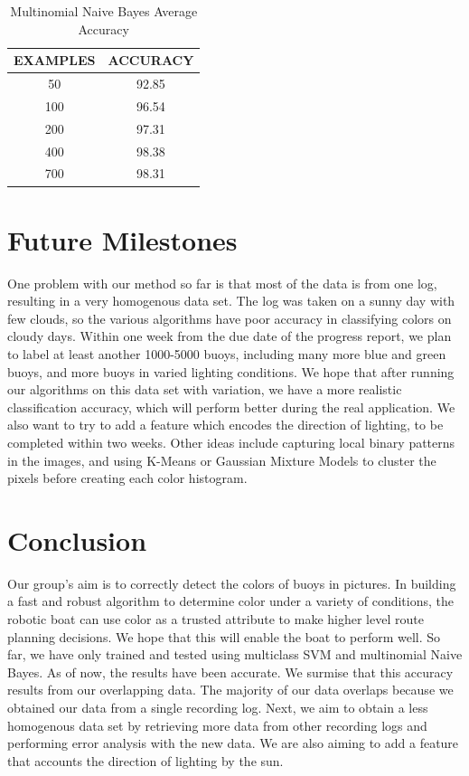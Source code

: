 \documentclass{article} %
\begin{document}
\begin{table}[hp]
\caption{Multinomial Naive Bayes Average Accuracy}
\begin{center}
\begin{tabular}{c|c}
{\bf EXAMPLES}  &{\bf ACCURACY}
\\ \hline 
50              &92.85 \\
100             &96.54 \\
200             &97.31 \\
400             &98.38 \\
700             &98.31 \\
\end{tabular}
\end{center}
\end{table}

\section{Future Milestones}

One problem with our method so far is that most of the data is from one log, resulting in a very homogenous data set. The log was taken on a sunny day with few clouds, so the various algorithms have poor accuracy in classifying colors on cloudy days. Within one week from the due date of the progress report, we plan to label at least another 1000-5000 buoys, including many more blue and green buoys, and more buoys in varied lighting conditions. We hope that after running our algorithms on this data set with variation, we have a more realistic classification accuracy, which will perform better during the real application. We also want to try to add a feature which encodes the direction of lighting, to be completed within two weeks. Other ideas include capturing local binary patterns in the images, and using K-Means or Gaussian Mixture Models to cluster the pixels before creating each color histogram.

\section{Conclusion}

Our group's aim is to correctly detect the colors of buoys in pictures. In building a fast and robust algorithm to determine color under a variety of conditions, the robotic boat can use color as a trusted attribute to make higher level route planning decisions. We hope that this will enable the boat to perform well. So far, we have only trained and tested using multiclass SVM and multinomial Naive Bayes. As of now, the results have been accurate. We surmise that this accuracy results from our overlapping data. The majority of our data overlaps because we obtained our data from a single recording log.  Next, we aim to obtain a less homogenous data set by retrieving more data from other recording logs and performing error analysis with the new data. We are also aiming to add a feature that accounts the direction of lighting by the sun.
\end{document}
